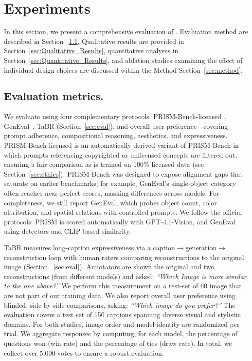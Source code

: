 



\section{Experiments}
\label{sec:exp}
In this section, we present a comprehensive evaluation of \modelname{}. Evaluation method are described in Section~.\ref{sec:eval_metrics}, Qualitative results are provided in Section~\ref{sec:Qualitative_Results}, quantitative analyses in Section~\ref{sec:Quantitative_Results}, and ablation studies examining the effect of individual design choices are discussed within the Method Section~\ref{sec:method}.



\subsection{Evaluation metrics.}
\label{sec:eval_metrics}
We evaluate \modelname{} using four complementary protocols: PRISM-Bench-licensed~\cite{fang2025flux}, GenEval~\cite{ghosh2023geneval}, TaBR (Section~\ref{sec:eval}), and overall user preference—covering prompt adherence, compositional reasoning, aesthetics, and expressiveness. 
PRISM-Bench-licensed is an automatically derived variant of PRISM-Bench in which prompts referencing copyrighted or unlicensed concepts are filtered out, ensuring a fair comparison as \modelname{} is trained on 100\% licensed data (see Section~\ref{sec:ethics}). PRISM-Bench was designed to expose alignment gaps that saturate on earlier benchmarks; for example, GenEval’s single-object category often reaches near-perfect scores, masking differences across models. 
For completeness, we still report GenEval, which probes object count, color attribution, and spatial relations with controlled prompts. We follow the official protocols: PRISM is scored automatically with GPT-4.1-Vision, and GenEval using detectors and CLIP-based similarity. 


TaBR measures long-caption expressiveness via a caption$\rightarrow$generation$\rightarrow$reconstruction loop with human raters comparing reconstructions to the original image (Section ~\ref{sec:eval}). Annotators are shown the original and two reconstructions (from different models) and asked: \textit{``Which Image is more similar to the one above?''}  We perform this measurement on a test-set of $60$ image that are not part of our training data. We also report overall user preference using blinded, side-by-side comparisons, asking: \textit{``Which image do you prefer?''} The evaluation covers a test set of 150 captions spanning diverse visual and stylistic domains. For both studies, image order and model identity are randomized per trial. We aggregate responses by computing, for each model, the percentage of questions won (win rate) and the percentage of ties (draw rate). In total, we collect over 5{,}000 votes to ensure a robust evaluation.



